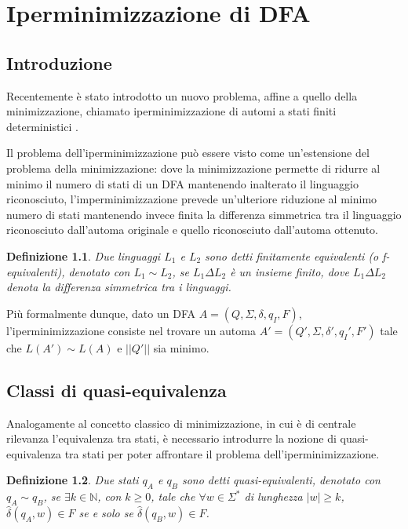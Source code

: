 \documentclass[a4paper,12pt]{report} %
\newtheorem{definition}{Definizione}[chapter] %
\begin{document}

\chapter{Iperminimizzazione di DFA}
\label{cap2}

\section{Introduzione}

Recentemente è stato introdotto un nuovo problema, affine a quello della minimizzazione, chiamato
iperminimizzazione di automi a stati finiti deterministici \parencite{BGS09}.

Il problema dell'iperminimizzazione può essere visto come un'estensione del problema della minimizzazione: dove la
minimizzazione permette di ridurre al minimo il numero di stati di un DFA mantenendo inalterato il linguaggio
riconosciuto, l'imperminimizzazione prevede un'ulteriore riduzione al minimo numero di stati mantenendo invece
finita la differenza simmetrica tra il linguaggio riconosciuto dall'automa originale e quello riconosciuto
dall'automa ottenuto.

\begin{definition}\label{def:f-equiv}
  Due linguaggi $L_1$ e $L_2$ sono detti \emph{finitamente equivalenti} (o \emph{f-equivalenti}), denotato con
  $L_1 \sim L_2$, se $L_1 \Delta L_2$ è un insieme finito, dove $L_1 \Delta L_2$ denota la differenza
  simmetrica tra i linguaggi.
\end{definition}

Più formalmente dunque, dato un DFA $A = (Q, \Sigma, \delta, q_I, F)$,
l'iperminimizzazione consiste nel trovare un automa $A' = (Q', \Sigma, \delta', q_I', F')$ tale
che $L(A') \sim L(A)$ e $||Q'||$ sia minimo.

\section{Classi di quasi-equivalenza}
\label{sec:aeq-classes}

Analogamente al concetto classico di minimizzazione, in cui è di centrale rilevanza l'equivalenza tra stati,
è necessario introdurre la nozione di quasi-equivalenza tra stati per poter affrontare il problema
dell'iperminimizzazione.

\begin{definition}\label{th:aeq-states}
  Due stati $q_A$ e $q_B$ sono detti \emph{quasi-equivalenti}, denotato con $q_A \sim q_B$, 
  se $\exists k \in \mathbb{N}$, con $k \ge 0$, tale che $\forall w \in \Sigma^*$ di lunghezza $|w| \ge k$,
  $\hat{\delta}(q_A, w) \in F$ se e solo se $\hat{\delta}(q_B, w) \in F$.
\end{definition}
\end{document}
